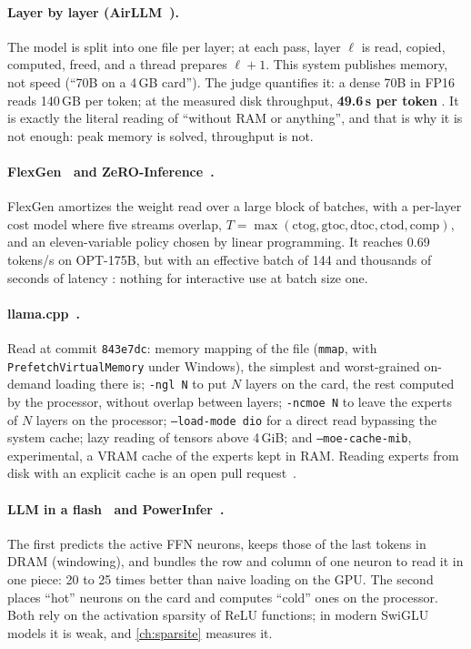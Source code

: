 \paragraph{Layer by layer (AirLLM~\cite{airllm2026}).} The model is split into one file per layer; at each pass, layer $\ell$ is read, copied, computed, freed, and a thread prepares $\ell+1$. This system publishes memory, not speed (\enquote{70B on a 4\,GB card}). The judge quantifies it: a dense 70B in FP16 reads 140\,GB per token; at the measured disk throughput, \textbf{49.6\,s per token} \calc. It is exactly the literal reading of \enquote{without RAM or anything}, and that is why it is not enough: peak memory is solved, throughput is not.

\paragraph{FlexGen~\cite{flexgen2023} and ZeRO-Inference~\cite{zeroinference2022}.} FlexGen amortizes the weight read over a large block of batches, with a per-layer cost model where five streams overlap, $T = \max(\text{ctog}, \text{gtoc}, \text{dtoc}, \text{ctod}, \text{comp})$, and an eleven-variable policy chosen by linear programming. It reaches 0.69 tokens/s on OPT-175B, but with an effective batch of 144 and thousands of seconds of latency \litt: nothing for interactive use at batch size one.

\paragraph{llama.cpp~\cite{llamacpp}.} Read at commit \texttt{843e7dc}: memory mapping of the file (\texttt{mmap}, with \texttt{PrefetchVirtualMemory} under Windows), the simplest and worst-grained on-demand loading there is; \texttt{-ngl N} to put $N$ layers on the card, the rest computed by the processor, without overlap between layers; \texttt{-ncmoe N} to leave the experts of $N$ layers on the processor; \texttt{--load-mode dio} for a direct read bypassing the system cache; lazy reading of tensors above 4\,GiB; and \texttt{--moe-cache-mib}, experimental, a VRAM cache of the experts kept in RAM. Reading experts from disk with an explicit cache is an open pull request~\cite{llamapr25294}.

\paragraph{LLM in a flash~\cite{llminflash2024} and PowerInfer~\cite{powerinfer2024,powerinfer2_2024}.} The first predicts the active FFN neurons, keeps those of the last tokens in DRAM (windowing), and bundles the row and column of one neuron to read it in one piece: 20 to 25 times better than naive loading on the GPU. The second places \enquote{hot} neurons on the card and computes \enquote{cold} ones on the processor. Both rely on the activation sparsity of ReLU functions; in modern SwiGLU models it is weak, and \cref{ch:sparsite} measures it.

